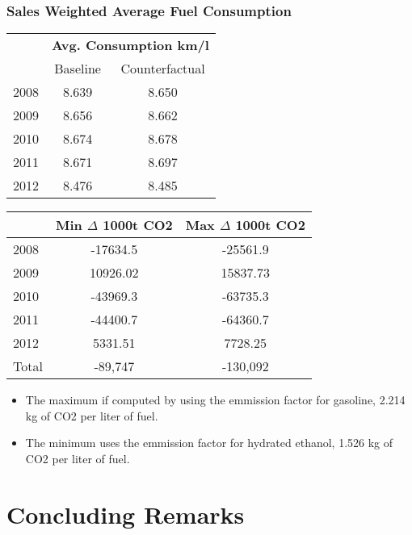 \documentclass{beamer}
\begin{document}
\begin{frame}[fragile]\frametitle{Sales Weighted Average Fuel Consumption}

\begin{minipage}{.4\textwidth}
\tiny    
      \begin{tabular}{l|cc}
  \toprule
              &\multicolumn{2}{c}{\textbf{Avg. Consumption km/l}}            \\
              &      Baseline&      Counterfactual\\
  \midrule
  2008        &       8.639&       8.650\\
  2009        &       8.656&       8.662\\
  2010        &       8.674&       8.678\\
  2011        &       8.671&       8.697\\
  2012        &       8.476&       8.485\\
  \bottomrule
  \end{tabular}
\end{minipage}
\begin{minipage}{.4\textwidth}
\tiny
\begin{tabular}{lcc}
  \toprule
        & Min $\Delta$ 1000t CO2 & Max $\Delta$ 1000t CO2 \\
  \midrule
  2008  & -17634.5 & -25561.9 \\
  2009  & 10926.02 & 15837.73 \\
  2010  & -43969.3 & -63735.3 \\
  2011  & -44400.7 & -64360.7 \\
  2012  & 5331.51 & 7728.25 \\
  \midrule
  Total & -89,747 & -130,092 \\
  \bottomrule
  \end{tabular}%

\end{minipage}

\begin{itemize}
    \item The maximum if computed by using the emmission factor for gasoline, 2.214 kg of CO2 per liter of fuel.
    \item The minimum uses the emmission factor for hydrated ethanol, 1.526 kg of CO2 per liter of fuel.
\end{itemize}

\end{frame}
\section{Concluding Remarks}
\end{document}
